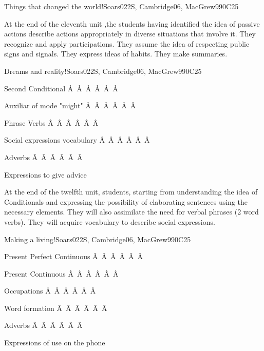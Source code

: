 \begin{syllabus}
\begin{unit}{Things that changed the world!}{}{Soars022S, Cambridge06, MacGrew99}{0}{C25}
   \begin{learningoutcomes}
      \item At the end of the eleventh unit ,the students having identified the idea of passive actions describe actions appropriately in diverse situations that involve it. They recognize and apply participations. They assume the idea of respecting public signs and signals. They express ideas of habits. They make summaries.
   \end{learningoutcomes}
\end{unit}

\begin{unit}{Dreams and reality!}{}{Soars022S, Cambridge06, MacGrew99}{0}{C25}
   \begin{topics}
       \item Second Conditional
Â Â Â Â Â Â  \item Auxiliar of mode "might"
Â Â Â Â Â Â  \item Phrase Verbs
Â Â Â Â Â Â  \item Social expressions vocabulary
Â Â Â Â Â Â  \item Adverbs
Â Â Â Â Â Â  \item Expressions to give advice
   \end{topics}

   \begin{learningoutcomes}
      \item At the end of the twelfth unit, students, starting from understanding the idea of Conditionals and expressing the possibility of elaborating sentences using the necessary elements. They will also assimilate the need for verbal phrases (2 word verbs). They will acquire vocabulary to describe social expressions.
   \end{learningoutcomes}
\end{unit}

\begin{unit}{Making a living!}{}{Soars022S, Cambridge06, MacGrew99}{0}{C25}
   \begin{topics}
       \item Present Perfect Continuous
Â Â Â Â Â Â  \item Present Continuous
Â Â Â Â Â Â  \item Occupations
Â Â Â Â Â Â  \item Word formation
Â Â Â Â Â Â  \item Adverbs
Â Â Â Â Â Â  \item Expressions of use on the phone
   \end{topics}


\end{unit}
\end{syllabus}
